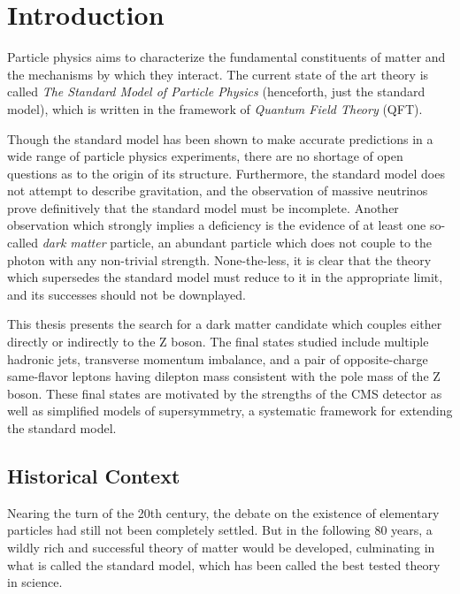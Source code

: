 \chapter{Introduction}
  Particle physics aims to characterize the fundamental constituents of matter and the mechanisms by which they interact. The current state of the art theory is called \emph{The Standard Model of Particle Physics} (henceforth, just the standard model), which is written in the framework of \emph{Quantum Field Theory} (QFT).

  Though the standard model has been shown to make accurate predictions in a wide range of particle physics experiments, there are no shortage of open questions as to the origin of its structure. Furthermore, the standard model does not attempt to describe gravitation, and the observation of massive neutrinos prove definitively that the standard model must be incomplete. Another observation which strongly implies a deficiency is the evidence of at least one so-called \emph{dark matter} particle, an abundant particle which does not couple to the photon with any non-trivial strength. None-the-less, it is clear that the theory which supersedes the standard model must reduce to it in the appropriate limit, and its successes should not be downplayed.

  This thesis presents the search for a dark matter candidate which couples either directly or indirectly to the Z boson. The final states studied include multiple hadronic jets, transverse momentum imbalance, and a pair of opposite-charge same-flavor leptons having dilepton mass consistent with the pole mass of the Z boson. These final states are motivated by the strengths of the CMS detector as well as simplified models of supersymmetry, a systematic framework for extending the standard model. 

\section{Historical Context}
  Nearing the turn of the 20th century, the debate on the existence of elementary particles had still not been completely settled. But in the following 80 years, a wildly rich and successful theory of matter would be developed, culminating in what is called the standard model, which has been called the best tested theory in science.

